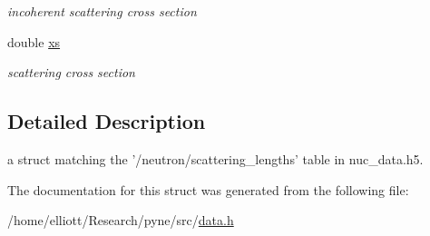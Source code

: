 \begin{DoxyCompactItemize}
\begin{DoxyCompactList}\small\item\em incoherent scattering cross section \end{DoxyCompactList}\item 
\hypertarget{structpyne_1_1scattering__lengths_aaaab6ef13d13f4058b263f0d28da9ac3}{double \hyperlink{structpyne_1_1scattering__lengths_aaaab6ef13d13f4058b263f0d28da9ac3}{xs}}\label{structpyne_1_1scattering__lengths_aaaab6ef13d13f4058b263f0d28da9ac3}

\begin{DoxyCompactList}\small\item\em scattering cross section \end{DoxyCompactList}\end{DoxyCompactItemize}


\subsection{Detailed Description}
a struct matching the '/neutron/scattering\-\_\-lengths' table in nuc\-\_\-data.\-h5. 

The documentation for this struct was generated from the following file\-:\begin{DoxyCompactItemize}
\item 
/home/elliott/\-Research/pyne/src/\hyperlink{data_8h}{data.\-h}\end{DoxyCompactItemize}
